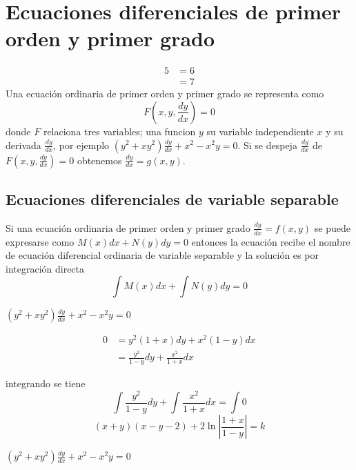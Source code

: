 \documentclass[10pt,]{krantz}
\theoremstyle{definition}
\theoremstyle{definition}
\theoremstyle{definition}
\theoremstyle{remark}
\let\BeginKnitrBlock\begin \let\EndKnitrBlock\end
\begin{document}
\hypertarget{ecuaciones-diferenciales-de-primer-orden-y-primer-grado}{%
\chapter{Ecuaciones diferenciales de primer orden y primer grado}\label{ecuaciones-diferenciales-de-primer-orden-y-primer-grado}}

\begin{align*}
  5&=6\\
  &=7
\end{align*}
Una ecuación ordinaria de primer orden y primer grado se representa como \[F\left(x,y,\frac{dy}{dx}\right)=0\] donde \(F\) relaciona tres variables; una funcion \(y\) su variable independiente \(x\) y su derivada \(\frac{dy}{dx}\), por ejemplo \(\left(y^2+xy^2\right)\frac{dy}{dx}+x^2-x^2y=0\). Si se despeja \(\frac{dy}{dx}\) de \(F\left(x,y,\frac{dy}{dx}\right)=0\) obtenemos \(\frac{dy}{dx}=g(x,y)\).

\hypertarget{ecuaciones-diferenciales-de-variable-separable}{%
\section{Ecuaciones diferenciales de variable separable}\label{ecuaciones-diferenciales-de-variable-separable}}

Si una ecuación ordinaria de primer orden y primer grado \(\frac{dy}{dx}=f(x,y)\) se puede expresarse como \(M(x)dx+N(y)dy=0\) entonces la ecuación recibe el nombre de ecuación diferencial ordinaria de variable separable y la solución es por integración directa \[\int M(x)dx+\int N(y)dy=0\]

\BeginKnitrBlock{exercise}
\protect\hypertarget{exr:unnamed-chunk-1}{}{\label{exr:unnamed-chunk-1} }\(\left(y^2+xy^2\right)\frac{dy}{dx}+x^2-x^2y=0\)
\EndKnitrBlock{exercise}

\BeginKnitrBlock{solution}
{}\begin{align*}
0&=y^2\left(1+x\right)dy+x^2\left(1-y\right)dx\\
&=\frac{y^2}{1-y}dy+\frac{x^2}{1+x}dx
\end{align*}

integrando se tiene \[\int\frac{y^2}{1-y}dy+\int\frac{x^2}{1+x}dx=\int 0\]
\[(x+y)(x-y-2)+2\ln\left\vert\frac{1+x}{1-y}\right\vert=k\]
\EndKnitrBlock{solution}

\BeginKnitrBlock{exercise}
\protect\hypertarget{exr:unnamed-chunk-3}{}{\label{exr:unnamed-chunk-3} }\(\left(y^2+xy^2\right)\frac{dy}{dx}+x^2-x^2y=0\)
\EndKnitrBlock{exercise}
\end{document}
